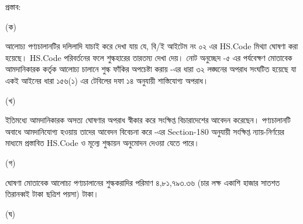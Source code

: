 \documentclass[12pt]{article}
\begin{document}
\begin{minipage}[t]{0.95\linewidth}
প্রস্তাব:
\end{minipage}
\begin{minipage}[t]{0.05\linewidth}
\hspace{0em}
\end{minipage}
\begin{minipage}[t]{0.05\linewidth}
(ক)
\end{minipage}
\begin{minipage}[t]{0.90\linewidth}
আলোচ্য পণ্যচালানটির দলিলাদি যাচাই করে দেখা যায় যে, বি/ই আইটেম নং ০২ এর HS.Code মিথ্যা ঘোষণা করা হয়েছে। HS.Code
পরিবর্তনের ফলে শুল্কহারের তারতম্য দেখা দেয়। নোট অনুচ্ছেদ -৫ এর পর্যবেক্ষণ মোতাবেক আমদানিকারক কর্তৃক আলোচ্য চালানে শুল্ক ফাঁকির অপচেষ্টা করায় {\tca} -এর
ধারা ৩২ লঙ্ঘনের অপরাধ সংঘটিত হয়েছে যা একই আইনের ধারা ১৫৬(১) এর টেবিলের দফা ১৪
অনুযায়ী শাস্তিযোগ্য অপরাধ।
\\
\end{minipage}
\begin{minipage}[t]{0.05\linewidth}
\hspace{0em}
\end{minipage}
\begin{minipage}[t]{0.05\linewidth}
(খ)
\end{minipage}
\begin{minipage}[t]{0.90\linewidth}
ইতিমধ্যে আমদানিকারক অসত্য ঘোষণার অপরাধ স্বীকার করে সংক্ষিপ্ত বিচারাদেশের আবেদন করেছেন। পণ্যচালানটি অবাধে আমদানিযোগ্য হওয়ায় তাদের আবেদন বিবেচনা করে {\tca}
-এর Section-180 অনুযায়ী সংক্ষিপ্ত ন্যায়-নির্ণয়ের মাধ্যমে প্রস্তাবিত
HS.Code ও মূল্যে শুল্কায়ন অনুমোদন দেওয়া যেতে পারে।
\\
\end{minipage}
\begin{minipage}[t]{0.05\linewidth}
\hspace{0em}
\end{minipage}
\begin{minipage}[t]{0.05\linewidth}
(গ)
\end{minipage}
\begin{minipage}[t]{0.90\linewidth}
ঘোষণা মোতাবেক আলোচ্য পণ্যচালানের শুল্ককরাদির পরিমাণ
৪,৮১,৭৯৩.৩৬ (চার লক্ষ একাশি হাজার সাতশত তিরানব্বই টাকা ছত্রিশ পয়সা) টাকা।
\\
\end{minipage}
\begin{minipage}[t]{0.05\linewidth}
\hspace{0em}
\end{minipage}
\begin{minipage}[t]{0.05\linewidth}
(ঘ)
\end{minipage}
\end{document}
